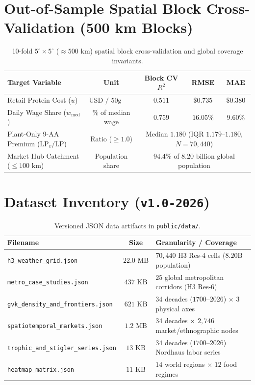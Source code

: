 \documentclass[11pt,a4paper]{article}
\begin{document}
\section{Out-of-Sample Spatial Block Cross-Validation (500 km Blocks)}
\begin{table}[h!]
\centering
\caption{10-fold $5^\circ \times 5^\circ$ ($\approx 500\text{ km}$) spatial block cross-validation and global coverage invariants.}
\begin{tabular}{lcccc}
\toprule
\textbf{Target Variable} & \textbf{Unit} & \textbf{Block CV $R^2$} & \textbf{RMSE} & \textbf{MAE} \\
\midrule
Retail Protein Cost ($u$) & $\text{USD / 50g DIAAS}$ & $0.511$ & $\$0.735$ & $\$0.380$ \\
Daily Wage Share ($w_{\text{med}}$) & $\%$ of median wage & $0.759$ & $16.05\%$ & $9.60\%$ \\
Plant-Only 9-AA Premium ($\text{LP}_v/\text{LP}$) & Ratio ($\ge 1.0$) & \multicolumn{3}{c}{Median $1.180$ (IQR $1.179\text{--}1.180$, $N=70{,}440$)} \\
Market Hub Catchment ($\le 100\text{ km}$) & Population share & \multicolumn{3}{c}{$94.4\%$ of $8.20\text{ billion}$ global population} \\
\bottomrule
\end{tabular}
\end{table}

\section{Dataset Inventory (\texttt{v1.0-2026})}
\begin{table}[h!]
\centering
\caption{Versioned JSON data artifacts in \texttt{public/data/}.}
\begin{tabular}{lcl}
\toprule
\textbf{Filename} & \textbf{Size} & \textbf{Granularity / Coverage} \\
\midrule
\texttt{h3\_weather\_grid.json} & $22.0\text{ MB}$ & $70{,}440$ H3 Res-4 cells ($8.20\text{B}$ population) \\
\texttt{metro\_case\_studies.json} & $437\text{ KB}$ & $25$ global metropolitan corridors (H3 Res-6) \\
\texttt{gvk\_density\_and\_frontiers.json} & $621\text{ KB}$ & $34$ decades ($1700\text{--}2026$) $\times$ $3$ physical axes \\
\texttt{spatiotemporal\_markets.json} & $1.2\text{ MB}$ & $34$ decades $\times$ $2{,}746$ market/ethnographic nodes \\
\texttt{trophic\_and\_stigler\_series.json} & $13\text{ KB}$ & $34$ decades ($1700\text{--}2026$) Nordhaus labor series \\
\texttt{heatmap\_matrix.json} & $11\text{ KB}$ & $14$ world regions $\times$ $12$ food regimes \\
\bottomrule
\end{tabular}
\end{table}
\end{document}
